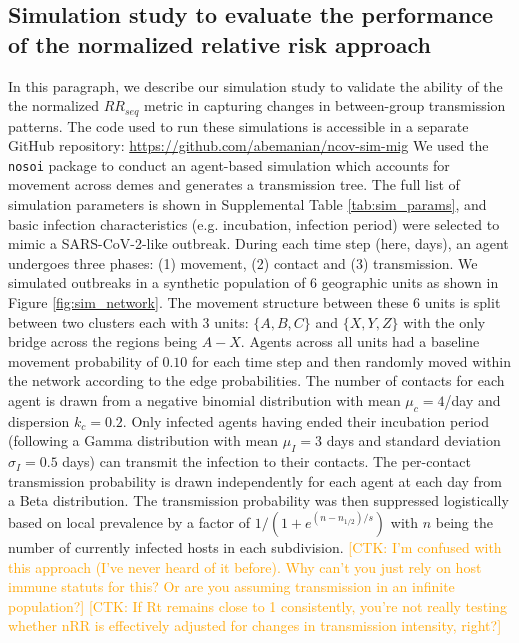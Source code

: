 \documentclass[11pt, letterpaper, oneside]{article}
\def\ctkc#1{\textcolor{orange}{[CTK: #1]}}
\begin{document}
\subsection{Simulation study to evaluate the performance of the normalized relative risk approach}

In this paragraph, we describe our simulation study to validate the ability of the the normalized $RR_{seq}$ metric in capturing changes in between-group transmission patterns.
The code used to run these simulations is accessible in a separate GitHub repository: \url{https://github.com/abemanian/ncov-sim-mig}
We used the \texttt{nosoi} package\autocite{lequimeNosoiStochasticAgentbased2020} to conduct an agent-based simulation which accounts for movement across demes and generates a transmission tree.
The full list of simulation parameters is shown in Supplemental Table \ref{tab:sim_params}, and basic infection characteristics (e.g. incubation, infection period) were selected to mimic a SARS-CoV-2-like outbreak.
During each time step (here, days), an agent undergoes three phases: (1) movement, (2) contact and (3) transmission.
We simulated outbreaks in a synthetic population of 6 geographic units as shown in Figure \ref{fig:sim_network}.
The movement structure between these 6 units is split between two clusters each with 3 units: $\{A, B, C\}$ and $\{X, Y, Z\}$ with the only bridge across the regions being $A-X$.
Agents across all units had a baseline movement probability of $0.10$ for each time step and then randomly moved within the network according to the edge probabilities.
The number of contacts for each agent is drawn from a negative binomial distribution with mean $\mu_{c} = 4$/day and dispersion $k_{c} = 0.2$.
Only infected agents having ended their incubation period (following a Gamma distribution with mean $\mu_{I} = 3$ days and standard deviation $\sigma_{I} = 0.5$ days) can transmit the infection to their contacts.
The per-contact transmission probability is drawn independently for each agent at each day from a Beta distribution.
The transmission probability was then suppressed logistically based on local prevalence by a factor of $1/(1+e^{(n-n_{1/2})/s})$ with $n$ being the number of currently infected hosts in each subdivision.
\ctkc{I'm confused with this approach (I've never heard of it before). Why can't you just rely on host immune statuts for this? Or are you assuming transmission in an infinite population?}
\ctkc{If Rt remains close to 1 consistently, you're not really testing whether nRR is effectively adjusted for changes in transmission intensity, right?}
\end{document}
